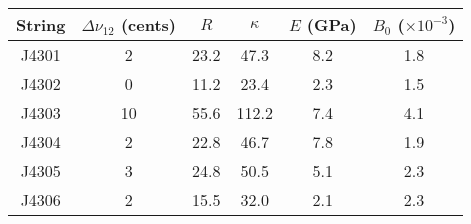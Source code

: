 \begin{tabular}{cccccc}
\toprule
String &  $\Delta \nu_{12}$ (cents) &  $R$ &  $\kappa$ &  $E$ (GPa) &  $B_0$ ($\times 10^{-3}$) \\
\midrule
 J4301 &                          2 & 23.2 &      47.3 &        8.2 &                       1.8 \\
 J4302 &                          0 & 11.2 &      23.4 &        2.3 &                       1.5 \\
 J4303 &                         10 & 55.6 &     112.2 &        7.4 &                       4.1 \\
 J4304 &                          2 & 22.8 &      46.7 &        7.8 &                       1.9 \\
 J4305 &                          3 & 24.8 &      50.5 &        5.1 &                       2.3 \\
 J4306 &                          2 & 15.5 &      32.0 &        2.1 &                       2.3 \\
\bottomrule
\end{tabular}

